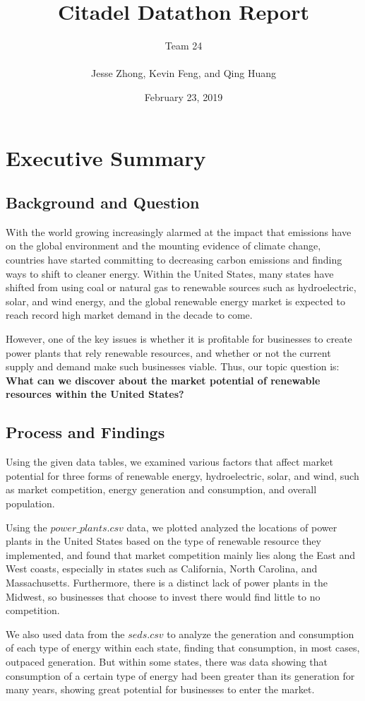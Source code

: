 \documentclass[12pt]{article}
\title{Citadel Datathon Report}
\author{Team 24\\\\Jesse Zhong, Kevin Feng, and Qing Huang}
\date{February 23, 2019}
\begin{document}
\maketitle 
\newpage
\section{Executive Summary}

\subsection{Background and Question}
With the world growing increasingly alarmed at the impact that emissions have on the global environment and the mounting evidence of climate change, countries have started committing to decreasing carbon emissions and finding ways to shift to cleaner energy. Within the United States, many states have shifted from using coal or natural gas to renewable sources such as hydroelectric, solar, and wind energy, and the global renewable energy market is expected to reach record high market demand in the decade to come. 

However, one of the key issues is whether it is profitable for businesses to create power plants that rely renewable resources, and whether or not the current supply and demand make such businesses viable. Thus, our topic question is: \textbf{What can we discover about the market potential of renewable resources within the United States?}

\subsection{Process and Findings}
Using the given data tables, we examined various factors that affect market potential for three forms of renewable energy, hydroelectric, solar, and wind, such as market competition, energy generation and consumption, and overall population. 

Using the $power\_plants.csv$ data, we plotted analyzed the locations of power plants in the United States based on the type of renewable resource they implemented, and found that market competition mainly lies along the East and West coasts, especially in states such as California, North Carolina, and Massachusetts. Furthermore, there is a distinct lack of power plants in the Midwest, so businesses that choose to invest there would find little to no competition. 

We also used data from the $seds.csv$ to analyze the generation and consumption of each type of energy within each state, finding that consumption, in most cases, outpaced generation. But within some states, there was data showing that consumption of a certain type of energy had been greater than its generation for many years, showing great potential for businesses to enter the market.
\end{document}
